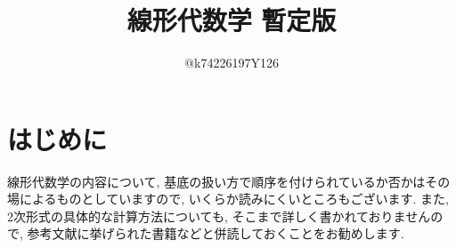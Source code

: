 \documentclass[10pt,a4paper,titlepage]{jsarticle}
\title{線形代数学 暫定版}
\author{@k74226197Y126}
\begin{document}
\maketitle
{}
\section*{はじめに}
\par
線形代数学の内容について, 基底の扱い方で順序を付けられているか否かはその場によるものとしていますので, いくらか読みにくいところもございます. また, 2次形式の具体的な計算方法についても, そこまで詳しく書かれておりませんので, 参考文献に挙げられた書籍などと併読しておくことをお勧めします. 
\tableofcontents
\clearpage
{}


\clearpage

\clearpage

\clearpage

\clearpage

\clearpage

\clearpage

\clearpage

\clearpage

\clearpage

\clearpage

\clearpage


\clearpage

\clearpage

\clearpage

\clearpage

\clearpage

\clearpage

\clearpage

\clearpage


\clearpage

\clearpage

\clearpage

\clearpage

\clearpage

\clearpage

\clearpage

\clearpage

\clearpage

\clearpage

\clearpage


\clearpage

\clearpage

\clearpage

\clearpage

\clearpage

\clearpage

\clearpage

\clearpage

\clearpage

\end{document}
